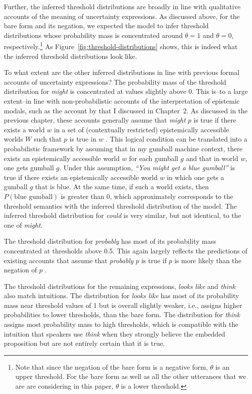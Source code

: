 Further, the inferred threshold distributions are broadly in line with qualitative accounts of the meaning of uncertainty expressions.
As discussed above, for the bare form and its negation, we expected the model to infer threshold distributions whose probability mass is concentrated 
around $\theta=1$ and $\theta=0$, respectively.\footnote{Note that since the negation of the bare form is a negative form, $\theta$ is an upper threshold. For the bare form as well as
all the other utterances that we are are considering in this paper, $\theta$ is a lower threshold.} As  Figure~\ref{fig:threshold-distributions} shows, this is indeed what
the inferred threshold distributions look like. 

To what extent are the other inferred distributions in line with previous formal accounts of uncertainty expressions? 
The probability mass of the threshold distribution for \textit{might} is  concentrated at values slightly above 0. This
is--to a large extent--in line with non-probabilistic accounts of the interpretation of epistemic modals, such as the account
by \cite{Kratzer2012} that I discussed in Chapter~2. As discussed in the previous chapter, these accounts generally assume that \textit{might} $p$ is true 
if there exists a world $w$ in a set of (contextually restricted) epistemically accessible worlds $W$ such that $p$ is true in $w$ 
\parencite[e.g.,][]{Kratzer1991,Swanson2008,Hacquard2011}. This logical condition can be translated into a probabilistic framework by assuming that 
in my gumball machine context, there exists an epistemically accessible world $w$ for each gumball $g$ and that in world $w$, one gets gumball $g$. 
Under this assumption, \textit{``You might get a blue gumball''} is true if there exists an epistemically accessible world $w$  in which one gets a
gumball $g$ that is blue. At the same time, if such a world exists, then $P(\mbox{blue gumball})$ is greater than 0, which approximately corresponds
to the threshold semantics with the inferred threshold distribution of the model. The inferred threshold distribution for \textit{could} is very similar, 
but not identical, to the one of \textit{might}.

The threshold distribution for \textit{probably} has most of its probability mass concentrated at thresholds above 0.5. This again largely reflects the predictions of 
existing accounts that assume that \textit{probably} $p$ is true if $p$ is more likely than the negation of $p$ .

The threshold distributions for the remaining expressions, \textit{looks like} and \textit{think} also match intuitions. The distribution for 
\textit{looks like} has most of its probability mass near threshold values of 1 but is overall slightly weaker, i.e., assigns higher probabilities to lower thresholds,
than the bare form. The distribution for \textit{think} assigns most probability mass to high thresholds, which is compatible with the intuition
that speakers use \textit{think} when they strongly believe the embedded proposition but are not entirely certain that it is true.

